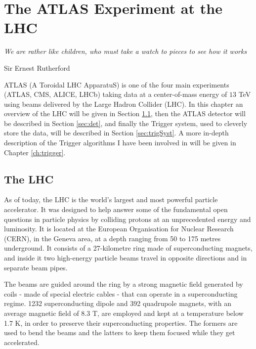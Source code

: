 \chapter{The ATLAS Experiment at the LHC}
\epigraph{\emph{We are rather like children, who must take a watch to pieces to see how it works}}{Sir Ernest Rutherford}

	ATLAS (A Toroidal LHC ApparatuS) is one of the four main experiments (ATLAS, CMS, ALICE, LHCb) taking data at a center-of-mass energy of $13$ TeV using beams delivered by the Large Hadron Collider (LHC). In this chapter an overview of the LHC will be given in Section \ref{sec:lhc}, then the ATLAS detector will be described in Section \ref{sec:det}, and finally the Trigger system, used to cleverly store the data, will be described in Section \ref{sec:trigSyst}. A more in-depth description of the Trigger algorithms I have been involved in will be given in Chapter \ref{ch:trigger}.



	\section{The LHC}
	\label{sec:lhc}
	
		As of today, the LHC is the world’s largest and most powerful particle accelerator. It was designed to help answer some of the fundamental open questions in particle physics by colliding protons at an unprecedented energy and luminosity. It is located at the European Organisation for Nuclear Research (CERN), in the Geneva area, at a depth ranging from 50 to 175 metres underground. It consists of a 27-kilometre ring made of superconducting magnets, and inside it two high-energy particle beams travel in opposite directions and in separate beam pipes. 

		The beams are guided around the ring by a strong magnetic field generated by coils - made of special electric cables - that can operate in a superconducting regime.%
		1232 superconducting dipole and 392 quadrupole magnets, with an average magnetic field of 8.3 T, are employed and kept at a temperature below 1.7 K, in order to preserve their superconducting properties. The formers are used to bend the beams and the latters to keep them focused while they get accelerated. 
		
